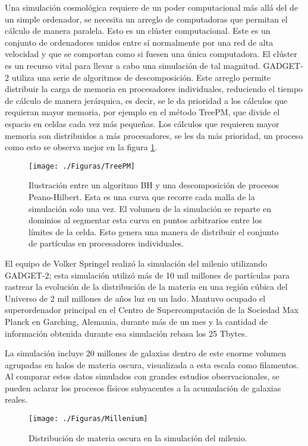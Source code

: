 \documentclass[a4paper,openright,12pt]{book}
\begin{document}
Una simulación cosmológica requiere de un poder computacional más allá del de un simple ordenador, se necesita un arreglo de computadoras que permitan el cálculo de manera paralela. Esto es un clúster computacional. Este es un conjunto de ordenadores unidos entre sí normalmente por una red de alta velocidad y que se comportan como si fuesen una única computadora. El clúster es un recurso vital para llevar a cabo una simulación de tal magnitud. GADGET-2 utiliza una serie de algoritmos de descomposición. Este arreglo permite distribuir la carga de memoria en procesadores individuales, reduciendo el tiempo de cálculo de manera jerárquica, es decir, se le da prioridad a los cálculos que requieran mayor memoria, por ejemplo en el método TreePM, que divide el espacio en celdas cada vez más pequeñas. Los cálculos que requieren mayor memoria son distribuidos a más procesadores, se les da más prioridad, un proceso como esto se observa mejor en la figura \ref{fig 3.1}.
\begin{figure}
\centering
  \texttt{[image: ./Figuras/TreePM]}
  \caption{\footnotesize{Ilustración entre un algoritmo BH y una descomposición de procesos Peano-Hilbert. Esta es una curva que recorre cada malla de la simulación solo una vez. El volumen de la simulación se reparte en dominios al segmentar esta curva en puntos arbitrarios entre los límites de la celda. Esto genera una manera de distribuir el conjunto de partículas en procesadores individuales.}}
  \label{fig 3.1}
\end{figure}

El equipo de Volker Springel realizó la simulación del milenio \cite{3.0.3}utilizando GADGET-2; esta simulación utilizó más de 10 mil millones de partículas para rastrear la evolución de la distribución de la materia en una región cúbica del Universo de 2 mil millones de años luz en un lado. Mantuvo ocupado el superordenador principal en el Centro de Supercomputación de la Sociedad Max Planck en Garching, Alemania, durante más de un mes y la cantidad de información obtenida durante esa simulación rebasa los 25 Tbytes.

La simulación incluye 20 millones de galaxias dentro de este enorme volumen agrupadas en halos de materia oscura, visualizada a esta escala como filamentos. Al comparar estos datos simulados con grandes estudios observacionales, se pueden aclarar los procesos físicos subyacentes a la acumulación de galaxias reales.

\begin{figure}
\centering
  \texttt{[image: ./Figuras/Millenium]}
 \caption{\footnotesize{Distribución de materia oscura en la simulación del milenio.}}
  \label{fig 3.2}
\end{figure}
\end{document}
